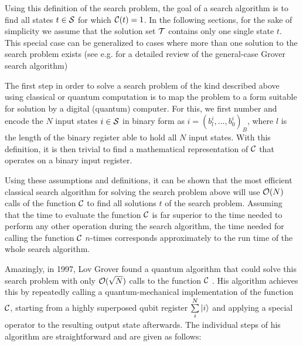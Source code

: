 \smallskip

Using this definition of the search problem, the goal of a search algorithm is to find all states $t\in\begin{mathcal}S\end{mathcal}$ for which $\Or(t) = 1$. In the following sections, for the sake of simplicity we assume that the solution set $\begin{mathcal}T\end{mathcal}$ contains only one single state $t$. This special case can be generalized to cases where more than one solution to the search problem exists (see e.g. \cite{nielsen_quantum_2000,mermin_quantum_2007} for a detailed review of the general-case Grover search algorithm)

\smallskip

The first step in order to solve a search problem of the kind described above using classical or quantum computation is to map the problem to a form suitable for solution by a digital (quantum) computer. For this, we first number and encode the $N$ input states $i \in \begin{mathcal}S\end{mathcal}$ in binary form as $i=(b^i_l,\hdots,b^i_0)_B$, where $l$ is the length of the binary register able to hold all $N$ input states. With this definition, it is then trivial to find a mathematical representation of $\Or$ that operates on a binary input register. 

\smallskip

Using these assumptions and definitions, it can be shown that the most efficient classical search algorithm for solving the search problem above will use $\begin{mathcal}O\end{mathcal}(N)$ calls of the function $\Or$ to find all solutions $t$ of the search problem. Assuming that the time to evaluate the function $\Or$ is far superior to the time needed to perform any other operation during the search algorithm, the time needed for calling the function $\Or$ $n$-times corresponds approximately to the run time of the whole search algorithm.

\smallskip

Amazingly, in 1997, Lov Grover found a quantum algorithm that could solve this search problem with only $\begin{mathcal}O\end{mathcal}(\sqrt{N})$ calls to the function $\Or$ \citep{Grover_Quantum_1997}. His algorithm achieves this by repeatedly calling a quantum-mechanical implementation of the function $\Or$, starting from a highly superposed qubit register $\sum\limits_i^N \left| i \right>$ and applying a special operator to the resulting output state afterwards. The individual steps of his algorithm are straightforward and are given as follows:


